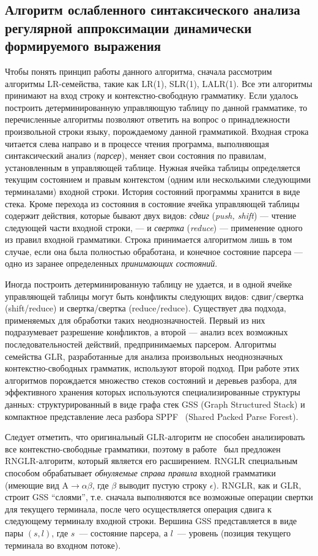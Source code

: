 \subsection{Алгоритм ослабленного синтаксического анализа регулярной аппроксимации динамически формируемого выражения}
Чтобы понять принцип работы данного алгоритма, сначала рассмотрим алгоритмы LR-семейства, такие как LR(1), SLR(1), LALR(1). Все эти алгоритмы принимают на вход строку и контекстно-свободную грамматику. Если удалось построить детерминированную управляющую таблицу по данной грамматике, то перечисленные алгоритмы позволяют ответить на вопрос о принадлежности произвольной строки языку, порождаемому данной грамматикой. Входная строка читается слева направо и в процессе чтения программа, выполняющая синтаксический анализ (\emph{парсер}), меняет свои состояния по правилам, установленным в управляющей таблице. Нужная ячейка таблицы определяется текущим состоянием и правым контекстом (одним или несколькими следующими терминалами) входной строки. История состояний программы хранится в виде стека. Кроме перехода из состояния в состояние ячейка управляющей таблицы содержит действия, которые бывают двух видов: \emph{сдвиг} (\emph{push, shift}) --- чтение следующей части входной строки, --- и \emph{свертка} (\emph{reduce}) --- применение одного из правил входной грамматики. Строка принимается алгоритмом лишь в том случае, если она была полностью обработана, и конечное состояние парсера --- одно из заранее определенных \emph{принимающих состояний}.

Иногда построить детерминированную таблицу не удается, и в одной ячейке управляющей таблицы могут быть конфликты следующих видов: сдвиг/свертка (shift/reduce) и свертка/свертка (reduce/reduce). Существует два подхода, применяемых для обработки таких неоднозначностей. Первый из них подразумевает разрешение конфликтов, а второй --- анализ всех возможных последовательностей действий, предпринимаемых парсером. Алгоритмы семейства GLR, разработанные для анализа произвольных неоднозначных контекстно-свободных грамматик, используют второй подход. При работе этих алгоритмов порождается множество стеков состояний и деревьев разбора, для эффективного хранения которых используются специализированные структуры данных: структурированный в виде графа стек GSS (Graph Structured Stack) и компактное представление леса разбора SPPF~\cite{SPPF} (Shared Packed Parse Forest).

Следует отметить, что оригинальный GLR-алгоритм не способен анализировать все контекстно-свободные грамматики, поэтому в работе~\cite{RNGLR} был предложен RNGLR-алгоритм, который является его расширением. RNGLR специальным способом обрабатывает \emph{обнуляемые справа правила} входной грамматики (имеющие вид $\mathrm{A} \rightarrow \alpha \beta$, где $\beta$ выводит пустую строку $\epsilon$). RNGLR, как и GLR, строит GSS ``слоями'', т.е. сначала выполняются все возможные операции свертки для текущего терминала, после чего осуществляется операция сдвига к следующему терминалу входной строки. Вершина GSS представляется в виде пары $(s,l)$, где $s$~--- состояние парсера, а $l$~--- уровень (позиция текущего терминала во входном потоке).


